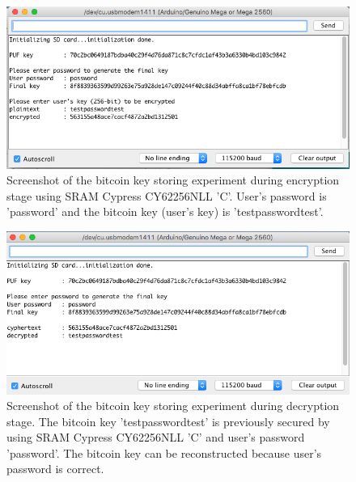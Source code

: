 \begin{figure}[tph!]
    \centerline{\includegraphics[width={\textwidth}]{images/C_encrypt}}
    \caption{Screenshot of the bitcoin key storing experiment during encryption stage using SRAM Cypress CY62256NLL 'C'.
    User's password is 'password' and the bitcoin key (user's key) is 'testpasswordtest'.}
    \label{fig:C_encrypt}
\end{figure}

\begin{figure}[tph!]
    \centerline{\includegraphics[width={\textwidth}]{images/C_decrypt_correct}}
    \caption{Screenshot of the bitcoin key storing experiment during decryption stage. The bitcoin key 'testpasswordtest' is previously secured by using SRAM Cypress CY62256NLL 'C' and user's password 'password'.
    The bitcoin key can be reconstructed because user's password is correct.}
    \label{fig:C_decrypt_correct}
\end{figure}


